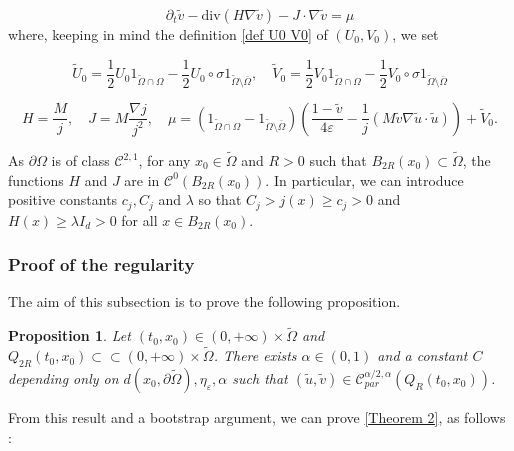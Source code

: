 \documentclass[reqno,12pt,twoside]{amsart}
\newtheorem{proposition}{Proposition}[section]
\numberwithin{equation}{section} \numberwithin{theorem}{section}
\numberwithin{proposition}{section} \numberwithin{lemma}{section}
\numberwithin{corollary}{section}
\numberwithin{definition}{section} \numberwithin{remark}{section}
\begin{document}
\begin{equation}\label{boun eqv vrai}
\partial_t \widetilde{v} - \text{div}\left(H \nabla \widetilde{v}\right) - J\cdot \nabla \widetilde{v} = \mu
\end{equation}
where, keeping in mind the definition \eqref{def U0 V0} of $(U_0,V_0)$, we set

\begin{equation}\label{def U0tilde}
\widetilde{U}_0 = \frac{1}{2}U_0 1_{\widetilde{\Omega}\cap \Omega} - \frac{1}{2} U_0\circ \sigma 1_{\widetilde{\Omega}\setminus \overline{\Omega}}, \quad \widetilde{V}_0 = \frac{1}{2}V_0 1_{\widetilde{\Omega}\cap \Omega} - \frac{1}{2} V_0\circ \sigma 1_{\widetilde{\Omega}\setminus \overline{\Omega}}
\end{equation}

\begin{equation}\label{def mu}
H =  \frac{M}{j}, \quad J =  M\frac{\nabla j}{j^2} , \quad \mu = (1_{\widetilde{\Omega} \cap \Omega} - 1_{\widetilde{\Omega} \setminus \overline{\Omega}}) \left(\frac{1-\widetilde{v}}{4\varepsilon} - \frac{1}{j}(M\widetilde{v}\nabla \widetilde{u} \cdot \widetilde{u})\right) + \widetilde{V}_0.
\end{equation}

As $\partial\Omega$ is of class $\mathcal{C}^{2,1}$, for any $x_0\in \widetilde{\Omega}$ and $R >0$ such that $B_{2R}(x_0) \subset \widetilde{\Omega}$, the functions $H$ and $J$ are in $\mathcal{C}^0(B_{2R}(x_0))$. In particular, we can introduce positive constants $c_j, C_j$ and $\lambda$ so that $C_j >j(x) \geqslant c_j > 0$ and $H(x)\geqslant \lambda I_d >0$ for all $x\in B_{2R}(x_0)$. 
 
\subsubsection{Proof of the regularity}

The aim of this subsection is to prove the following proposition. 

\begin{proposition}\label{prop : uv holder}
Let $(t_0,x_0) \in (0,+\infty)\times \widetilde{\Omega}$ and $Q_{2R}(t_0,x_0) \subset\subset (0, +\infty)\times \widetilde{\Omega}$. 
There exists $\alpha \in (0,1)$ and a constant $C$ depending only on $d(x_0, \partial \widetilde{\Omega}), \eta_\varepsilon, \alpha$ such that $(\widetilde{u}, \widetilde{v})\in \mathcal{C}^{\alpha/2,\alpha}_{par}(Q_R(t_0,x_0))$. 
\end{proposition}
From this result and a bootstrap argument, we can prove \autoref{Theorem 2}, as follows :
\end{document}
